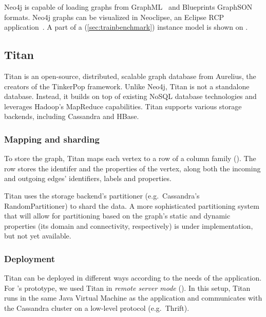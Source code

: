 Neo4j is capable of loading graphs from GraphML~\cite{GraphML} and Blueprints GraphSON~\cite{BlueprintsGraphSON} formats. Neo4j graphs can be visualized in Neoclipse, an Eclipse RCP application~\cite{Neoclipse}. A part of a \tb{} (\autoref{sec:trainbenchmark}) instance model is shown on .



\subsection{Titan}
\label{subsec:titan}

Titan %
is an open-source, distributed, scalable graph database from Aurelius, the creators of the TinkerPop framework. Unlike Neo4j, Titan is not a standalone database. Instead, it builds on top of existing NoSQL database technologies and leverages Hadoop's MapReduce capabilities. Titan supports various storage backends, including Cassandra and HBase.


\subsubsection{Mapping and sharding}

To store the graph, Titan maps each vertex to a row of a column family (). The row stores the identifer and the properties of the vertex, along both the incoming and outgoing edges' identifiers, labels and properties.

Titan uses the storage backend's partitioner (e.g.\ Cassandra's RandomPartitioner) to shard the data. A more sophisticated partitioning system that will allow for partitioning based on the graph's static and dynamic properties (its domain and connectivity, respectively) is under implementation, but not yet available.


\subsubsection{Deployment}

Titan can be deployed in different ways according to the needs of the application. For \iqd's prototype, we used Titan in \textit{remote server mode} (). In this setup, Titan runs in the same Java Virtual Machine as the application and communicates with the Cassandra cluster on a low-level protocol (e.g.\ Thrift).

